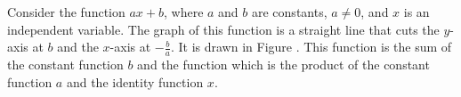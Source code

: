 \begin{example}\label{exam 1.3.4}
Consider the function $ax + b$,
where $a$ and $b$ are constants,
$a \neq 0$,
and $x$ is an independent variable.
The graph of this function is a straight line
that cuts the $y$-axis at $b$ and the $x$-axis at $-\frac{b}{a}$.
It is drawn in Figure .
This function is the sum of the constant function $b$
and the function which is the product of the constant function $a$
and the identity function $x$.
\end{example}

